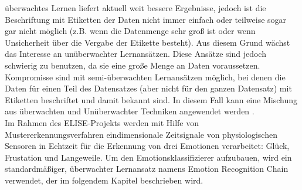{\"u}berwachtes Lernen liefert aktuell weit bessere Ergebnisse, jedoch ist die Beschriftung mit Etiketten der Daten nicht immer einfach oder teilweise sogar gar nicht m{\"o}glich (z.B. wenn die Datenmenge sehr gro{\ss} ist oder wenn Unsicherheit {\"u}ber die Vergabe der Etikette besteht).
Aus diesem Grund w{\"a}chst das Interesse an un{\"u}berwachter Lernans{\"a}tzen.
Diese Ans{\"a}tze sind jedoch schwierig zu benutzen, da sie eine gro{\ss}e Menge an Daten voraussetzen.
Kompromisse sind mit semi-{\"u}berwachten Lernans{\"a}tzen m{\"o}glich, bei denen die Daten f{\"u}r einen Teil des Datensatzes (aber nicht f{\"u}r den ganzen Datensatz) mit Etiketten beschriftet und damit bekannt sind.
In diesem Fall kann eine Mischung aus {\"u}berwachten und Un{\"u}berwachter Techniken angewendet werden \cite{Zhu2008}. \\


Im Rahmen des ELISE-Projekts werden mit Hilfe von Mustererkennungsverfahren eindimensionale Zeitsignale von physiologischen Sensoren in Echtzeit f{\"u}r die Erkennung von drei Emotionen verarbeitet: Gl{\"u}ck, Frustation und Langeweile. Um den Emotionsklassifizierer aufzubauen, wird ein standardm{\"a}{\ss}iger, {\"u}berwachter Lernansatz namens Emotion Recognition Chain verwendet, der im folgendem Kapitel beschrieben wird. \\